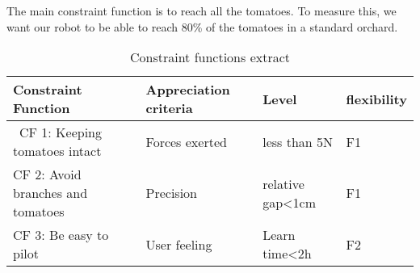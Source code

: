 \bigbreak
The main constraint function is to reach all the tomatoes. To measure this, we want our robot to be able to reach 80\% of the tomatoes in a standard orchard. 

\begin{table}[ht]
    \centering    
    \begin{tabular}{|p{3cm} | p{3cm} | p{3cm} | p{3cm} |} 
        \hline
        \textbf{Constraint Function} & \textbf{Appreciation criteria} & \textbf{Level} & \textbf{flexibility} \\ [0.5ex] 
        \hline\
        CF 1: Keeping tomatoes intact & Forces exerted & less than 5N & F1 \\ 
        \hline
        CF 2: Avoid branches and tomatoes & Precision & relative gap<1cm & F1 \\
        \hline
        CF 3: Be easy to pilot & User feeling & Learn time<2h & F2 \\
        \hline
    \end{tabular}
    \caption{Constraint functions extract}
\end{table}
